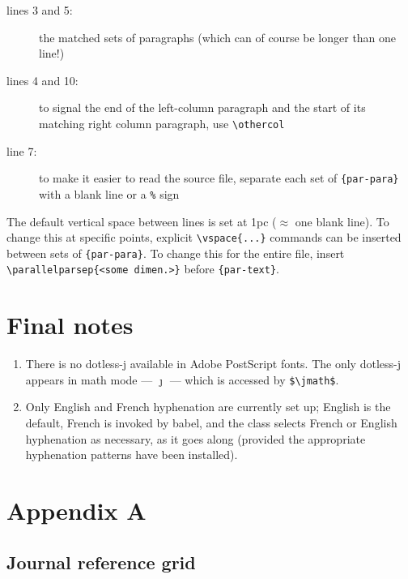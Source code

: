 \begin{description}
   \item [lines 3 and 5:] the matched sets of paragraphs (which can of
         course be longer than one line!) 

   \item [lines 4 and 10:] to signal the end of the left-column
         paragraph and the start of its matching right column
         paragraph, use \verb|\othercol|

   \item [line 7:] to make it easier to read the source file, separate
         each set of \verb|{par-para}| with a blank line or a {\tt \%}
         sign
\end{description}

 The default vertical space between lines is set
at 1pc ($\approx$ one blank line). To change this at specific points,
explicit \verb|\vspace{...}| commands can be inserted between sets of
\verb|{par-para}|. To change this for the entire file, insert
\verb|\parallelparsep{<some dimen.>}| before \verb|{par-text}|.


\section{Final notes}

\begin{enumerate} \itemsep=0pt
   \item There is no dotless-j available in Adobe PostScript fonts.  
         The only dotless-j appears in math mode --- $\jmath$ ---
         which is accessed by \verb|$\jmath$|.

   \item Only English and French hyphenation are currently set up;
         English is the default, French is invoked by \textsf{babel},
         and the class selects French or English hyphenation as
         necessary, as it goes along (provided the appropriate
         hyphenation patterns have been installed).
\end{enumerate}

\clearpage


\section*{Appendix A}

\subsection*{Journal reference grid}

